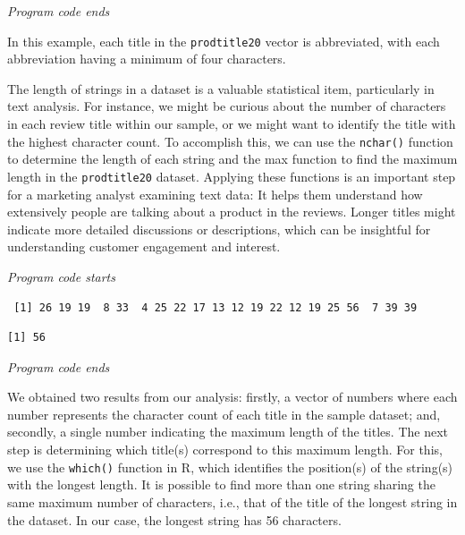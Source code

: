 \emph{Program code ends}

In this example, each title in the \texttt{prodtitle20} vector is
abbreviated, with each abbreviation having a minimum of four characters.

The length of strings in a dataset is a valuable statistical item,
particularly in text analysis. For instance, we might be curious about
the number of characters in each review title within our sample, or we
might want to identify the title with the highest character count. To
accomplish this, we can use the \texttt{nchar()} function to determine
the length of each string and the max function to find the maximum
length in the \texttt{prodtitle20} dataset. Applying these functions is
an important step for a marketing analyst examining text data: It helps them 
understand how extensively people are talking about a product in the
reviews. Longer titles might indicate more detailed discussions
or descriptions, which can be insightful for understanding customer
engagement and interest.

\emph{Program code starts}

\begin{Shaded}
\begin{Highlighting}[]
\end{Highlighting}
\end{Shaded}

\begin{verbatim}
 [1] 26 19 19  8 33  4 25 22 17 13 12 19 22 12 19 25 56  7 39 39
\end{verbatim}

\begin{Shaded}
\begin{Highlighting}[]
\NormalTok{(}
\end{Highlighting}
\end{Shaded}

\begin{verbatim}
[1] 56
\end{verbatim}

\emph{Program code ends}

We obtained two results from our analysis: firstly, a vector of numbers
where each number represents the character count of each title in the
sample dataset; and, secondly, a single number indicating the maximum
length of the titles. The next step is determining which
title(s) correspond to this maximum length. For this, we use the
\texttt{which()} function in R, which identifies the position(s) of the
string(s) with the longest length. It is possible to find more than one
string sharing the same maximum number of characters, i.e., that of the
title of the longest string in the dataset. In our case, the longest
string has 56 characters.


